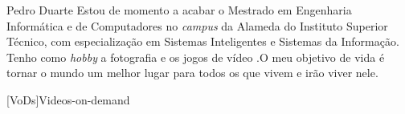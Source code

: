 \documentclass[a4paper,12pt,journal,twoside,compsoc]{PPIEEEtran}
\begin{document}
\begin{IEEEbiography}{Pedro Duarte}
Estou de momento a acabar o Mestrado em Engenharia Informática e de Computadores no \textit{campus} da Alameda do Instituto Superior Técnico, com especialização em Sistemas Inteligentes e Sistemas da Informação. Tenho como \textit{hobby} a fotografia e os jogos de vídeo .O meu objetivo de vida é tornar o mundo um melhor lugar para todos os que vivem e irão viver nele. 
\end{IEEEbiography}





	[VoDs]{Videos-on-demand}
	
\end{document}
